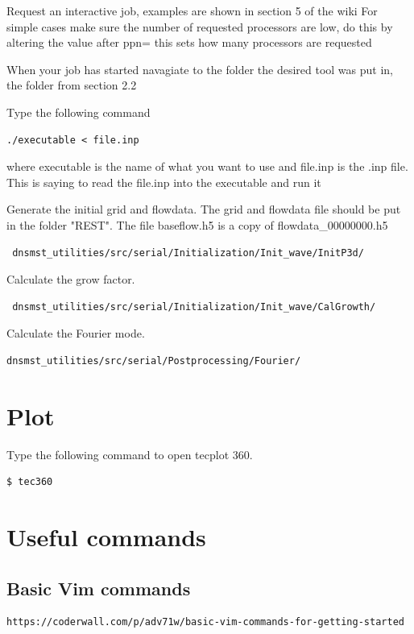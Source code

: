 \documentclass[12pt, oneside]{article}
\begin{document}
Request an interactive job, examples are shown in section 5 of the wiki
	For simple cases make sure the number of requested processors are low, do this by altering the value after ppn= this sets how many processors are requested

When your job has started navagiate to the folder the desired tool was put in, the folder from section 2.2

Type the following command 
\begin{verbatim}
./executable < file.inp
\end{verbatim}
	where executable is the name of what you want to use and file.inp is the .inp file.
	This is saying to read the file.inp into the executable and run it









Generate the initial grid and flowdata. The grid and flowdata file should be put in the folder "REST". The file baseflow.h5 is a copy of flowdata\_00000000.h5
\begin{verbatim}
 dnsmst_utilities/src/serial/Initialization/Init_wave/InitP3d/
\end{verbatim}

\noindent
Calculate the grow factor.
\begin{verbatim}
 dnsmst_utilities/src/serial/Initialization/Init_wave/CalGrowth/
\end{verbatim}


\noindent
Calculate the Fourier mode.
\begin{verbatim}
dnsmst_utilities/src/serial/Postprocessing/Fourier/
\end{verbatim}


\section{Plot}

Type the following command to open tecplot 360.

\begin{verbatim}
$ tec360 
\end{verbatim}



\section{Useful commands}

\subsection{Basic Vim commands}
\begin{verbatim}
https://coderwall.com/p/adv71w/basic-vim-commands-for-getting-started
\end{verbatim}
\end{document}
